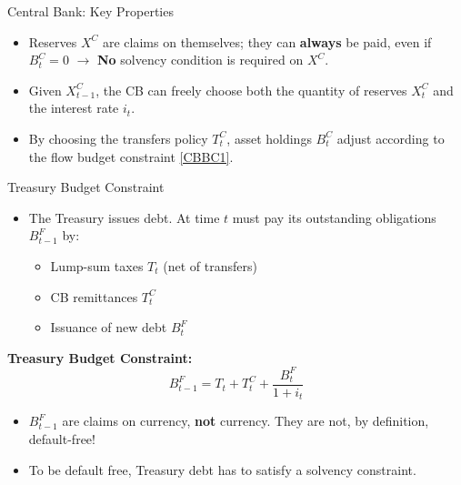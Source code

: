 \documentclass[11pt,aspectratio=169]{beamer}
\begin{document}
\begin{frame}{Central Bank: Key Properties}

\begin{itemize}
    \item Reserves $X^{C}$ are claims on themselves; they can \textbf{always} be paid, even if $B_t^C = 0$ $\longrightarrow$ \textbf{No} solvency condition is required on $X^{C}$. 
    \vspace{0.25cm}
    \item Given $X_{t-1}^C$, the CB can freely choose both the quantity of reserves $X_t^C$ and the interest rate $i_t$.
    \vspace{0.25cm}
    \item By choosing the transfers policy $T_t^C$, asset holdings $B_t^C$ adjust according to the flow budget constraint \eqref{CBBC1}.

\end{itemize}

\end{frame}

\begin{frame}{Treasury Budget Constraint}

\begin{itemize}
    \item The Treasury issues debt. At time $t$ must pay its outstanding obligations $B_{t-1}^{F}$ by:
    \begin{itemize}
        \item Lump-sum taxes $T_t$ (net of transfers)
        \item CB remittances $T_t^C$
        \item Issuance of new debt $B_t^F$
    \end{itemize}
\end{itemize}

\vspace{0.25cm}
\noindent\textbf{Treasury Budget Constraint:}
\begin{equation}
B_{t-1}^{F} = T_t + T_t^C + \frac{B_t^F}{1+i_t}
\label{BudgetT}
\end{equation}

\begin{itemize}
    \item $B_{t-1}^{F}$ are claims on currency, \textbf{not} currency. They are not, by definition, default-free!
    \vspace{0.25cm}
    \item To be default free, Treasury debt has to satisfy a solvency constraint.
\end{itemize}

\end{frame}
\end{document}
